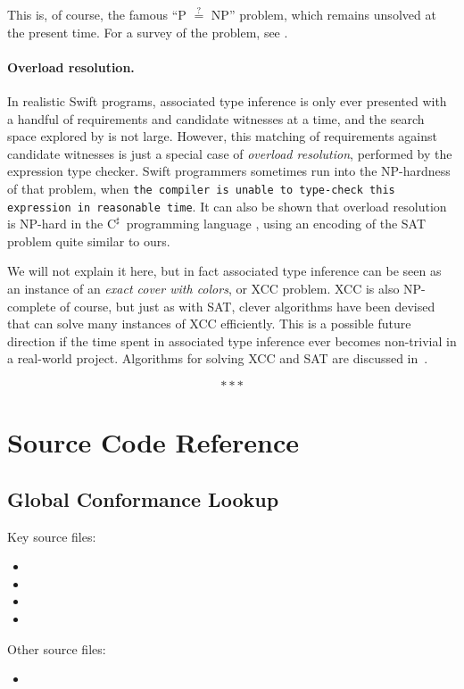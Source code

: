 \documentclass[../generics]{subfiles}
\begin{document}
This is, of course, the famous ``{P} $\stackrel{?}{=}$ {NP}'' problem, which remains unsolved at the present time. For a survey of the problem, see \cite{pvnp}.

\paragraph{Overload resolution.}
In realistic Swift programs, associated type inference is only ever presented with a handful of requirements and candidate witnesses at a time, and the search space explored by  is not large. However, this matching of requirements against candidate witnesses is just a special case of \emph{overload resolution}, performed by the expression type checker. Swift programmers sometimes run into the NP-hardness of that problem, when \texttt{the compiler is unable to type-check this expression in reasonable time}. It can also be shown that overload resolution is NP-hard in the $\mathrm{C}^\sharp$~programming language \cite{csharpsat}, using an encoding of the SAT problem quite similar to ours.

We will not explain it here, but in fact associated type inference can be seen as an instance of an \emph{exact cover with colors}, or XCC problem. XCC is also NP-complete of course, but just as with SAT, clever algorithms have been devised that can solve many instances of XCC efficiently. This is a possible future direction if the time spent in associated type inference ever becomes non-trivial in a real-world project. Algorithms for solving XCC and SAT are discussed in~\cite{art4b}.

\begin{ceqn}
\[\ast \ast \ast\]
\end{ceqn}

\vfill
\eject

\section{Source Code Reference}\label{conformancesourceref}

\subsection*{Global Conformance Lookup}

Key source files:
\begin{itemize}
\item {}
\item {}
\item {}
\item {}
\end{itemize}
Other source files:
\begin{itemize}
\item {}
\end{itemize}
\end{document}
